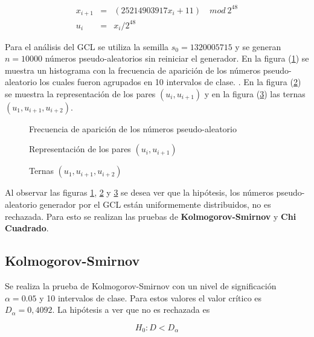 \documentclass{SPANISH_acm_proc_article-sp}
\begin{document}
\begin{eqnarray}
	x_{i + 1} & = & (25214903917x_{i} + 11) \quad mod \  2^{48} \\
	u_{i} & = & x_{i} / 2^{48}
\end{eqnarray}

Para el an\'alisis del GCL se utiliza la semilla $s_{0} = 1320005715$ y se generan $n = 10000$ n\'umeros pseudo-aleatorios sin reiniciar el generador. En la figura (\ref{fig:histRandom}) se muestra un histograma con la frecuencia de aparici\'on de los n\'umeros pseudo-aleatorio los cuales fueron agrupados en 10 intervalos de clase. . En la figura (\ref{fig:random2D}) se muestra la representaci\'on de los pares $(u_{i}, u_{i+1})$ y en la figura (\ref{fig:random3D}) las ternas $(u_{1}, u_{i+1}, u_{i+2})$. 

\begin{figure}
\centering
{}
\caption{Frecuencia de aparici\'on de los n\'umeros pseudo-aleatorio}
\label{fig:histRandom}
\end{figure}

\begin{figure}
\centering
{}
\caption{Representaci\'on de los pares $(u_{i}, u_{i+1})$}
\label{fig:random2D}
\end{figure}

\begin{figure}
\centering
{}
\caption{Ternas $(u_{1}, u_{i+1}, u_{i+2})$}
\label{fig:random3D}
\end{figure}

Al observar las figuras \ref{fig:histRandom}, \ref{fig:random2D} y \ref{fig:random3D} se desea ver que la hip\'otesis, los n\'umeros pseudo-aleatorio generador por el GCL est\'an uniformemente distribuidos, no es rechazada. Para esto se realizan las pruebas de \textbf{Kolmogorov-Smirnov} y \textbf{Chi Cuadrado}.

\subsection{Kolmogorov-Smirnov}
Se realiza la prueba de Kolmogorov-Smirnov con un nivel de significaci\'on $\alpha = 0.05$ y 10 intervalos de clase. Para estos valores el valor cr\'itico es $D_{\alpha} = 0,4092$. La hip\'otesis a ver que no es rechazada es 

\begin{equation}
		H_{0}: D < D_{\alpha}
\end{equation}
\end{document}
